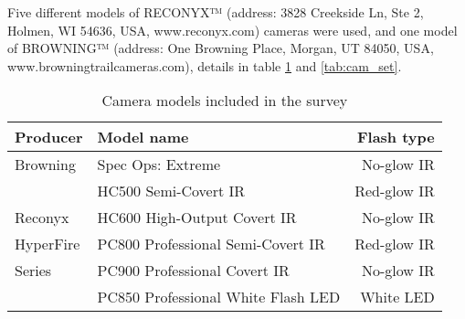 
Five different models of RECONYX™ (address: 3828 Creekside Ln, Ste 2, Holmen, WI 54636, USA, www.reconyx.com) cameras were used, 
and one model of BROWNING™ (address: One Browning Place, Morgan, UT 84050, USA, www.browningtrailcameras.com), details in table \ref{tab:cam_mod} and \ref{tab:cam_set}.


\begin{table}[h]
\caption{Camera models included in the survey}
\label{tab:cam_mod}
\centering

\begin{tabular}{llr}
\hline
Producer  & Model name & Flash type  \\
\hline 
Browning	& Spec Ops: Extreme 					& No-glow IR \\
			& HC500 Semi-Covert IR					& Red-glow IR \\
Reconyx		& HC600 High-Output Covert IR			& No-glow IR  \\
HyperFire 	& PC800 Professional Semi-Covert IR 	& Red-glow IR \\
Series 		& PC900 Professional Covert IR 			& No-glow IR  \\
    		& PC850 Professional White Flash LED	& White LED  \\
\hline
\end{tabular}
\end{table}


